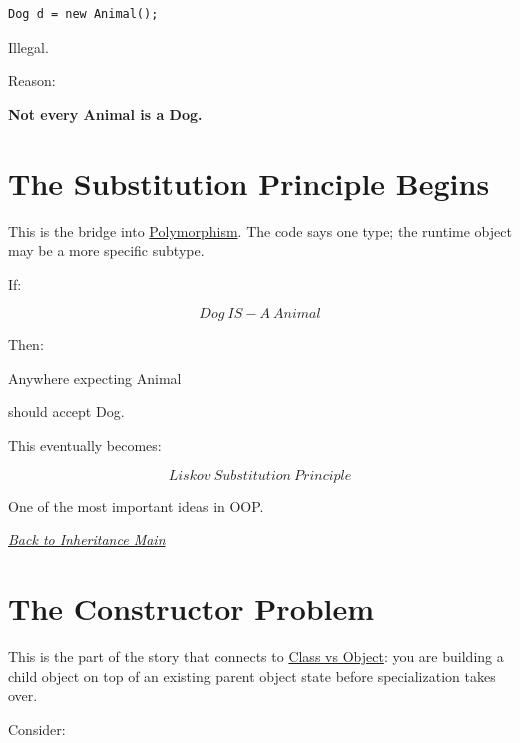 \documentclass[11pt,a4paper]{book}
\begin{document}
\begin{verbatim}
Dog d = new Animal();
\end{verbatim}


Illegal.


Reason:

\textbf{Not every Animal is a Dog.}


\section{The Substitution Principle Begins}

This is the bridge into \hyperref[chap:polymorphism]{Polymorphism}. The code says one type; the runtime object may be a more specific subtype.

If:

\[
Dog\ IS\!-\!A\ Animal
\]


Then:

Anywhere expecting Animal

should accept Dog.


This eventually becomes:

\textcolor{RosettaSeaGreen}{\[Liskov\ Substitution\ Principle\]}

One of the most important ideas in OOP.\@

\smallskip
\noindent
\hyperref[chap:inheritance]{\emph{Back to Inheritance Main}}


\section{The Constructor Problem}\label{sec:inheritance_constructor_problem}

This is the part of the story that connects to \hyperref[chap:class_vs_object]{Class vs Object}: you are building a child object on top of an existing parent object state before specialization takes over.

Consider:
\end{document}
